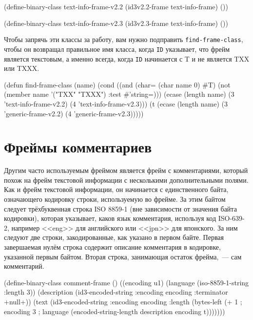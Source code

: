 \begin{myverb}
(define-binary-class text-info-frame-v2.2 (id3v2.2-frame text-info-frame) ())

(define-binary-class text-info-frame-v2.3 (id3v2.3-frame text-info-frame) ())
\end{myverb}

Чтобы запрячь эти классы за работу, вам нужно подправить \lstinline{find-frame-class}, чтобы он
возвращал правильное имя класса, когда \lstinline{ID} указывает, что фрейм является текстовым, а
именно всегда, когда \lstinline{ID} начинается с T и не является TXX или TXXX.

\begin{myverb}
(defun find-frame-class (name)
  (cond
    ((and (char= (char name 0) #\bslash{}T)
          (not (member name '("TXX" "TXXX") :test #'string=)))
     (ecase (length name)
       (3 'text-info-frame-v2.2)
       (4 'text-info-frame-v2.3)))
    (t
     (ecase (length name)
       (3 'generic-frame-v2.2)
       (4 'generic-frame-v2.3)))))
\end{myverb}

\section{Фреймы комментариев}

Другим часто используемым фреймом является фрейм с комментариями, который похож на фрейм
текстовой информации с несколькими дополнительными полями. Как и фрейм текстовой
информации, он начинается с единственного байта, означающего кодировку строки,
используемую во фрейме. За этим байтом следует трёхбуквенная строка ISO 8859-1 (вне
зависимости от значения байта кодировки), которая указывает, каков язык комментария,
используя код ISO-639-2, например <<eng>> для английского или <<jpn>> для японского. За ним
следуют две строки, закодированные, как указано в первом байте. Первая завершаемая нулём
строка содержит описание комментария в кодировке, указанной первым байтом. Вторая строка,
занимающая остаток фрейма,~--- сам комментарий.

\begin{myverb}
(define-binary-class comment-frame ()
  ((encoding u1)
   (language (iso-8859-1-string :length 3))
   (description (id3-encoded-string :encoding encoding :terminator +null+))
   (text (id3-encoded-string
          :encoding encoding
          :length (bytes-left
                   (+ 1 ; encoding
                      3 ; language
                      (encoded-string-length description encoding t)))))))
\end{myverb}

